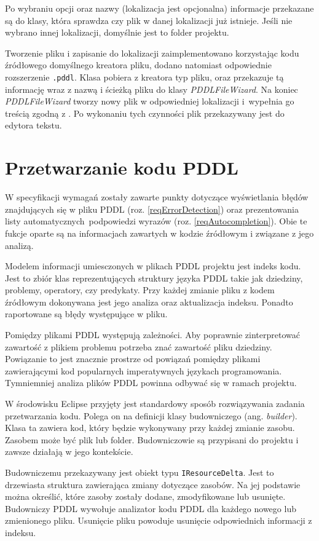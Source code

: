 Po wybraniu opcji oraz nazwy (lokalizacja jest opcjonalna) informacje przekazane są do klasy, która sprawdza czy plik w danej lokalizacji już istnieje. Jeśli nie wybrano innej lokalizacji, domyślnie jest to folder projektu.
 
Tworzenie pliku i zapisanie do lokalizacji zaimplementowano korzystając kodu źródłowego domyślnego kreatora pliku, dodano natomiast odpowiednie rozszerzenie \texttt{.pddl}. Klasa pobiera z kreatora typ pliku, oraz przekazuje tą informację wraz z nazwą i ścieżką pliku do klasy \emph{PDDLFileWizard}. Na koniec \emph{PDDLFileWizard} tworzy nowy plik w odpowiedniej lokalizacji i~wypełnia go treścią zgodną z . Po wykonaniu tych czynności plik przekazywany jest do edytora tekstu.

\section{Przetwarzanie kodu PDDL}
W specyfikacji wymagań zostały zawarte punkty dotyczące wyświetlania błędów znajdujących 
się w pliku PDDL (roz. \ref{reqErrorDetection}) oraz prezentowania listy automatycznych\
podpowiedzi wyrazów (roz. \ref{reqAutocompletion}).
Obie te fukcje oparte są na informacjach zawartych w kodzie źródłowym i związane
z jego analizą.

Modelem informacji umiesczonych w plikach PDDL projektu jest indeks kodu. Jest to
zbiór klas reprezentujących struktury języka PDDL takie jak dziedziny, problemy, operatory, czy predykaty.
Przy każdej zmianie pliku z kodem źródłowym dokonywana jest jego analiza oraz
aktualizacja indeksu. Ponadto raportowane są błędy występujące w pliku.

Pomiędzy plikami PDDL występują zależności. Aby poprawnie zinterpretować zawartość z plikiem
problemu potrzeba znać zawartość pliku dziedziny. Powiązanie to jest znacznie prostrze od 
powiązań pomiędzy plikami zawierającymi kod popularnych imperatywnych językach programowania.
Tymniemniej analiza plików PDDL powinna odbywać się w ramach projektu.

W środowisku Eclipse przyjęty jest standardowy sposób rozwiązywania zadania przetwarzania
kodu. Polega on na definicji klasy budowniczego (ang. \emph{builder}). Klasa ta
zawiera kod, który będzie wykonywany przy każdej zmianie zasobu. Zasobem
może być plik lub folder. Budowniczowie
są przypisani do projektu i zawsze działają w jego kontekście.

Budowniczemu przekazywany jest obiekt typu \texttt{IResourceDelta}. Jest to drzewiasta %
struktura zawierająca zmiany dotyczące zasobów. Na jej podstawie można określić, 
które zasoby zostały dodane, zmodyfikowane lub usunięte. Budowniczy PDDL wywołuje analizator
kodu PDDL dla każdego nowego lub zmienionego pliku. Usunięcie pliku powoduje usunięcie %
odpowiednich informacji z indeksu.


